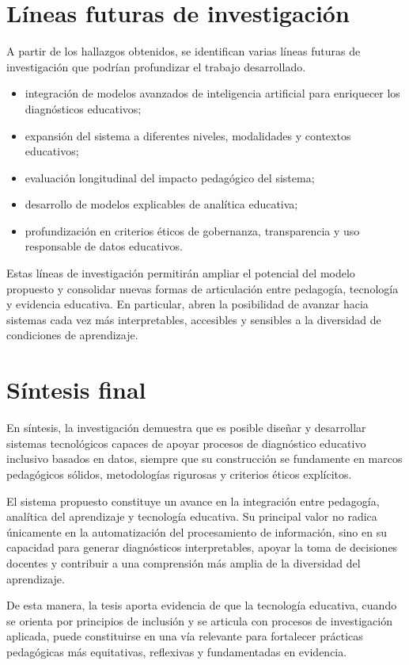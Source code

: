 \begin{refsection}
\section{Líneas futuras de investigación}

A partir de los hallazgos obtenidos, se identifican varias líneas futuras de investigación que podrían profundizar el trabajo desarrollado.

\begin{itemize}
\item integración de modelos avanzados de inteligencia artificial para enriquecer los diagnósticos educativos;
\item expansión del sistema a diferentes niveles, modalidades y contextos educativos;
\item evaluación longitudinal del impacto pedagógico del sistema;
\item desarrollo de modelos explicables de analítica educativa;
\item profundización en criterios éticos de gobernanza, transparencia y uso responsable de datos educativos.
\end{itemize}

Estas líneas de investigación permitirán ampliar el potencial del modelo propuesto y consolidar nuevas formas de articulación entre pedagogía, tecnología y evidencia educativa. En particular, abren la posibilidad de avanzar hacia sistemas cada vez más interpretables, accesibles y sensibles a la diversidad de condiciones de aprendizaje.

\section{Síntesis final}

En síntesis, la investigación demuestra que es posible diseñar y desarrollar sistemas tecnológicos capaces de apoyar procesos de diagnóstico educativo inclusivo basados en datos, siempre que su construcción se fundamente en marcos pedagógicos sólidos, metodologías rigurosas y criterios éticos explícitos.

El sistema propuesto constituye un avance en la integración entre pedagogía, analítica del aprendizaje y tecnología educativa. Su principal valor no radica únicamente en la automatización del procesamiento de información, sino en su capacidad para generar diagnósticos interpretables, apoyar la toma de decisiones docentes y contribuir a una comprensión más amplia de la diversidad del aprendizaje.

De esta manera, la tesis aporta evidencia de que la tecnología educativa, cuando se orienta por principios de inclusión y se articula con procesos de investigación aplicada, puede constituirse en una vía relevante para fortalecer prácticas pedagógicas más equitativas, reflexivas y fundamentadas en evidencia.

\printbibliography[heading=subbibliography,title={Referencias (Capítulo VI)}]

\end{refsection}